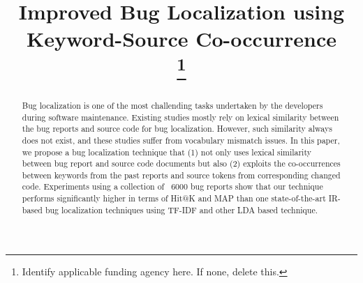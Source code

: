 \documentclass[conference]{IEEEtran}
\begin{document}
\title{Improved Bug Localization using Keyword-Source Co-occurrence\\
\thanks{Identify applicable funding agency here. If none, delete this.}
}

\author{

}

\maketitle

\begin{abstract}
Bug localization is one of the most challending tasks undertaken by the developers during software maintenance.
Existing studies mostly rely on lexical similarity between the bug reports and source code for bug localization.
However, such similarity always does not exist, and these studies suffer from vocabulary mismatch issues.
In this paper, we propose a bug localization technique that (1) not only uses lexical similarity between bug report and source code documents  
but also (2) exploits the co-occurrences between keywords from the past reports and source tokens from corresponding changed code.
Experiments using a collection of ~6000 bug reports show that our technique performs significantly higher in terms of Hit@K and MAP
than one state-of-the-art IR-based bug localization techniques using TF-IDF and other LDA based technique.
\end{abstract}
\end{document}

